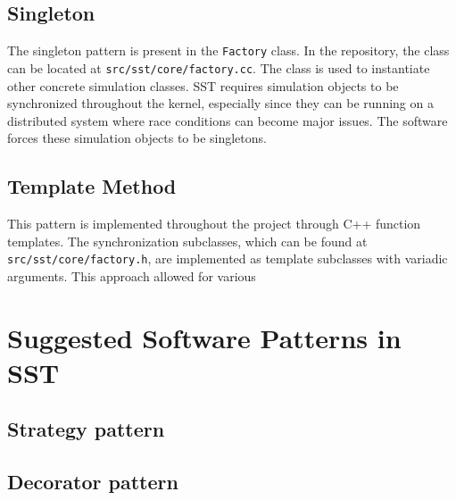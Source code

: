 \documentclass[titlepage]{article}
\begin{document}
\subsection{Singleton}
The singleton pattern is present in the \texttt{Factory} class. In the repository, the class can be located at \texttt{src/sst/core/factory.cc}. The class is used to instantiate other concrete simulation classes. SST requires simulation objects to be synchronized throughout the kernel, especially since they can be running on a distributed system where race conditions can become major issues. The software forces these simulation objects to be singletons.

\subsection{Template Method}
This pattern is implemented throughout the project through C++ function templates. The synchronization subclasses, which can be found at \texttt{src/sst/core/factory.h}, are implemented as template subclasses with variadic arguments. This approach allowed for various


\section{Suggested Software Patterns in SST}

\subsection{Strategy pattern}

\subsection{Decorator pattern}



\end{document}
